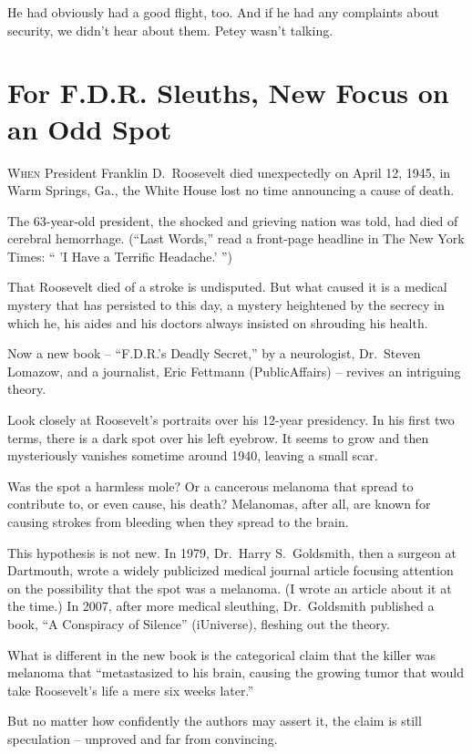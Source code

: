 ﻿\documentclass[12pt]{article}
\begin{document}
He had obviously had a good flight, too. And if he had any complaints about security, we didn't hear
about them. Petey wasn't talking.

\section{For F.D.R. Sleuths, New Focus on an Odd Spot}

\lettrine{W}{hen} President Franklin D.~Roosevelt died unexpectedly on April
12, 1945, in Warm Springs, Ga., the White House lost no time announcing a cause of death.

The 63-year-old president, the shocked and grieving nation was told, had died of cerebral
hemorrhage. (``Last Words,'' read a front-page headline in The New York Times: `` 'I Have a Terrific
Headache.' '')

That Roosevelt died of a stroke is undisputed. But what caused it is a medical mystery that has
persisted to this day, a mystery heightened by the secrecy in which he, his aides and his doctors
always insisted on shrouding his health.

Now a new book -- ``F.D.R.'s Deadly Secret,'' by a neurologist, Dr.~Steven Lomazow, and a
journalist, Eric Fettmann (PublicAffairs) -- revives an intriguing theory.

Look closely at Roosevelt's portraits over his 12-year presidency. In his first two terms, there is
a dark spot over his left eyebrow. It seems to grow and then mysteriously vanishes sometime around
1940, leaving a small scar.

Was the spot a harmless mole? Or a cancerous melanoma that spread to contribute to, or even cause,
his death? Melanomas, after all, are known for causing strokes from bleeding when they spread to the
brain.

This hypothesis is not new. In 1979, Dr.~Harry S.~Goldsmith, then a surgeon at Dartmouth, wrote a
widely publicized medical journal article focusing attention on the possibility that the spot was a
melanoma. (I wrote an article about it at the time.) In 2007, after more medical sleuthing,
Dr.~Goldsmith published a book, ``A Conspiracy of Silence'' (iUniverse), fleshing out the theory.

What is different in the new book is the categorical claim that the killer was melanoma that
``metastasized to his brain, causing the growing tumor that would take Roosevelt's life a mere six
weeks later.''

But no matter how confidently the authors may assert it, the claim is still speculation -- unproved
and far from convincing.
\end{document}
